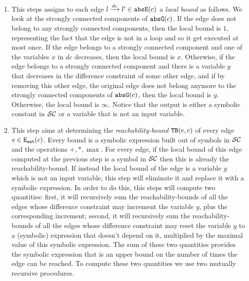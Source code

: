 \begin{enumerate}
\item This steps assigns to each edge  $l \xrightarrow{dc} l'\in \mathtt{abs}{\mathtt{E}}(c)$ a \emph{local bound} as follows. We look at the strongly connected components of $\mathtt{abs}{\mathtt{G}}(c)$. If the edge does not belong to any strongly connected components, then the local bound is $1$, representing the fact that the edge is not in a loop and so it get executed at most once. If the edge belongs to a strongly connected component and one of the variables $x$ in $dc$ decreases, then the local bound is $x$. Otherwise, if the edge belongs to a strongly connected component and there is a variable $y$ that decreases in the difference constraint of some other edge, and if by removing this other edge, the original edge does not belong anymore to the strongly connected components of $\mathtt{abs}{\mathtt{G}}(c)$, then the local bound is $y$. Otherwise, the local bound is $\infty$. Notice that the output is either a symbolic constant in $\mathcal{SC}$ or a variable that is not an input variable.
\item This step aims at determining the \emph{reachability-bound} ${\mathtt{TB}}(e, c)$ of every edge $e\in \mathtt{{E_{est}}}(c)$. Every bound is a symbolic expression built out of symbols in $\mathcal{SC}$ and the operations $+, *, \max$. For every edge, if the local bound of this edge computed at the previous step is a symbol in $\mathcal{SC}$ then this is already the reachability-bound. If instead the local bound of the edge is a variable $y$ which is not an input variable, this step will eliminate it and replace it with a symbolic expression. In order to do this, this steps will compute two quantities: first, it will recursively sum the reachability-bounds of all the edges whose difference constraint may increment the variable $y$, plus the corresponding increment; second, it will recursively sum the reachability-bounds of all the edges whose difference constraint may reset the variable $y$ to a (symbolic) expression that doesn't depend on it, multiplied by the maximal value of this symbolic expression. The sum of these two quantities provides the symbolic expression that is an upper bound on the number of times the edge can be reached. To compute these two quantities we use two mutually recursive procedures.
\end{enumerate}
